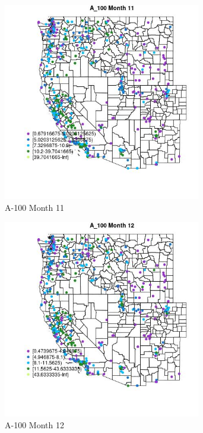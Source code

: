 \begin{figure} 
\centering  
\includegraphics[width=0.77\textwidth]{Code_Outputs/ML_input_report_ML_input_PM25_Step5_part_d_de_duplicated_aves_ML_input_MapObsMo11A_100.jpg} 
\caption{\label{fig:ML_input_report_ML_input_PM25_Step5_part_d_de_duplicated_aves_ML_inputMapObsMo11A_100}A-100 Month 11} 
\end{figure} 
 

\begin{figure} 
\centering  
\includegraphics[width=0.77\textwidth]{Code_Outputs/ML_input_report_ML_input_PM25_Step5_part_d_de_duplicated_aves_ML_input_MapObsMo12A_100.jpg} 
\caption{\label{fig:ML_input_report_ML_input_PM25_Step5_part_d_de_duplicated_aves_ML_inputMapObsMo12A_100}A-100 Month 12} 
\end{figure} 
 

